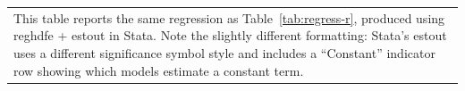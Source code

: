 \documentclass[english,authoryear,IEEEtran,12pt]{article}
\begin{document}
\begin{table}[htbp]
{\vspace{-1.5\baselineskip}
\singlespace
\flushleft
\begin{tabular}{@{}p{\linewidth}@{}}
\footnotesize
This table reports the same regression as Table~\ref{tab:regress-r}, produced using reghdfe + estout in Stata. Note the slightly different formatting: Stata's estout uses a different significance symbol style and includes a ``Constant'' indicator row showing which models estimate a constant term.
\end{tabular}
}
\end{table}
\end{document}
